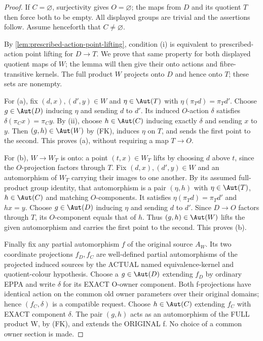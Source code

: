 \begin{proof}
If $C=\varnothing$, surjectivity gives $O=\varnothing$;
the maps from $D$ and its quotient $T$ then force both to be empty.
All displayed groups are trivial and the assertions follow.
Assume henceforth that $C\ne\varnothing$.

By \cref{lem:prescribed-action-point-lifting}, condition (i)
is equivalent to prescribed-action point lifting for $D\to T$.
We prove that same property for both displayed quotient maps of $W$;
the lemma will then give their onto actions and fibre-transitive kernels.
The full product $W$ projects onto $D$ and hence onto $T$;
these sets are nonempty.

For (a), fix $(d,x),(d',y)\in W$ and $\eta\in\Aut(T)$
with $\eta(\pi_Td)=\pi_Td'$. Choose $g\in\Aut(D)$ inducing
$\eta$ and sending $d$ to $d'$. Its induced $O$-action $\delta$
satisfies $\delta(\pi_Cx)=\pi_Cy$. By (ii), choose
$h\in\Aut(C)$ inducing exactly $\delta$ and sending $x$ to $y$.
Then $(g,h)\in\Aut(W)$ by (FK), induces $\eta$ on $T$,
and sends the first point to the second. This proves (a), without
requiring a map $T\to O$.

For (b), $W\to W_T$ is onto: a point $(t,x)\in W_T$ lifts
by choosing $d$ above $t$, since the $O$-projection factors through $T$.
Fix $(d,x),(d',y)\in W$ and an automorphism of $W_T$
carrying their images to one another. By its assumed full-product
group identity, that automorphism is a pair $(\eta,h)$ with
$\eta\in\Aut(T)$, $h\in\Aut(C)$ and matching $O$-components.
It satisfies $\eta(\pi_Td)=\pi_Td'$ and $hx=y$.
Choose $g\in\Aut(D)$ inducing $\eta$ and sending $d$ to $d'$.
Since $D\to O$ factors through $T$, its $O$-component equals
that of $h$. Thus $(g,h)\in\Aut(W)$ lifts the given automorphism
and carries the first point to the second. This proves (b).

Finally fix any partial
automorphism $f$ of
the original source
$A_W$. Its two
coordinate projections
$f_D,f_C$ are
well-defined partial
automorphisms of the
projected induced sources
by the ACTUAL named
equivalence-kernel and
quotient-colour hypothesis.
Choose a $g\in\Aut(D)$
extending $f_D$ by
ordinary EPPA and write
$\delta$ for its EXACT
O-owner component.
Both f-projections have
identical action on the
common old owner parameters
over their original
domains; hence
$(f_C,\delta)$ is a
compatible request.
Choose $h\in\Aut(C)$
extending $f_C$ with
EXACT component $\delta$.
The pair $(g,h)$
acts as an automorphism
of the FULL product W,
by (FK), and extends
the ORIGINAL f.
No choice of a common
owner section is made.
\end{proof}


